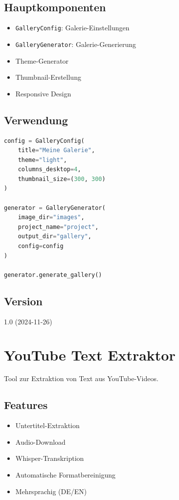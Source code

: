 \documentclass{vorlage-design-main}
\begin{document}
\subsection{Hauptkomponenten}\label{hauptkomponenten}

\begin{itemize}

\item
  \verb|GalleryConfig|: Galerie-Einstellungen
\item
  \verb|GalleryGenerator|: Galerie-Generierung
\item
  Theme-Generator
\item
  Thumbnail-Erstellung
\item
  Responsive Design
\end{itemize}

\subsection{Verwendung}\label{verwendung-5}

\begin{lstlisting}[language=Python]
config = GalleryConfig(
    title="Meine Galerie",
    theme="light",
    columns_desktop=4,
    thumbnail_size=(300, 300)
)

generator = GalleryGenerator(
    image_dir="images",
    project_name="project",
    output_dir="gallery",
    config=config
)

generator.generate_gallery()
\end{lstlisting}

\subsection{Version}\label{version-4}

1.0 (2024-11-26)

\section{YouTube Text Extraktor}\label{youtube-text-extraktor}

Tool zur Extraktion von Text aus YouTube-Videos.

\subsection{Features}\label{features-5}

\begin{itemize}

\item
  Untertitel-Extraktion
\item
  Audio-Download
\item
  Whisper-Transkription
\item
  Automatische Formatbereinigung
\item
  Mehrsprachig (DE/EN)
\end{itemize}
\end{document}
